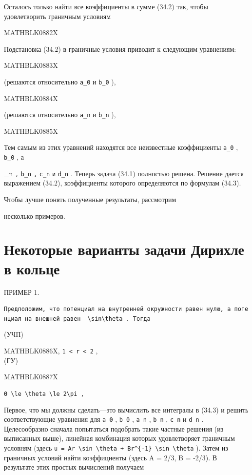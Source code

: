 \documentclass[
  ukrainian,
]{article}
\begin{document}
Осталось только найти все коэффициенты в сумме (34.2) так, чтобы
удовлетворить граничным условиям

MATHBLK0882X

Подстановка (34.2) в граничные условия приводит к следующим уравнениям:

MATHBLK0883X

(решаются относительно \texttt{a\_0} и \texttt{b\_0} ),

MATHBLK0884X

(решаются относительно \texttt{a\_n} и \texttt{b\_n} ),

MATHBLK0885X

Тем самым из этих уравнений находятся все неизвестные коэффициенты
\texttt{a\_0} , \texttt{b\_0} , а

\_n \texttt{,} \texttt{b\_n} \texttt{,} \texttt{c\_n} \texttt{и}
\texttt{d\_n} . Теперь задача (34.1) полностью решена. Решение дается
выражением (34.2), коэффициенты которого определяются по формулам
(34.3).

Чтобы лучше понять полученные результаты, рассмотрим

несколько примеров.

\section{Некоторые варианты задачи Дирихле в
кольце}\label{ux43dux435ux43aux43eux442ux43eux440ux44bux435-ux432ux430ux440ux438ux430ux43dux442ux44b-ux437ux430ux434ux430ux447ux438-ux434ux438ux440ux438ux445ux43bux435-ux432-ux43aux43eux43bux44cux446ux435-1}

ПРИМЕР 1.

\texttt{Предположим,\ что\ потенциал\ на\ внутренней\ окружности\ равен\ нулю,\ а\ потенциал\ на\ внешней\ равен\ \ \textquotesingle{}\textbackslash{}sin\textbackslash{}theta\textquotesingle{}\ .\ Тогда}

(УЧП)

MATHBLK0886X, \texttt{1\ \textless{}\ r\ \textless{}\ 2} ,\\
(ГУ)

MATHBLK0887X

\texttt{\textquotesingle{}0\ \textbackslash{}le\ \textbackslash{}theta\ \textbackslash{}le\ 2\textbackslash{}pi\textquotesingle{}\ ,}

Первое, что мы должны сделать---это вычислить все интегралы в (34.3) и
решить соответствующие уравнения для \texttt{a\_0} , \texttt{b\_0} ,
\texttt{a\_n} , \texttt{b\_n} , \texttt{c\_n} и \texttt{d\_n} .
Целесообразно сначала попытаться подобрать такие частные решения (из
выписанных выше), линейная комбинация которых удовлетворяет граничным
условням (здесь
\texttt{u\ =\ Ar\ \textbackslash{}sin\ \textbackslash{}theta\ +\ Br\^{}\{-1\}\ \textbackslash{}sin\ \textbackslash{}theta}
). Затем из граничных условий найти коэффициенты (здесь A = 2/3, B =
-2/3). В результате этих простых вычислений получаем
\end{document}
